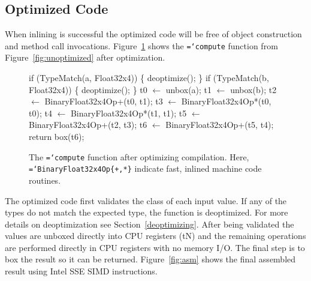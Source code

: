 \documentclass[preprint]{sigplanconf}
\newcommand{\ttt}[1]{{\texttt{\hyphenchar\font=`\-\relax #1}}}%
\begin{document}
\subsection{Optimized Code}

When inlining is successful the optimized code will be free of object
construction and method call invocations. Figure~\ref{fig:optimized} shows
the \ttt{compute} function from Figure~\ref{fig:unoptimized} after optimization.

\begin{figure}
\begin{small}
\begin{program}[style=tt, number=true]
if\tab{} (\!TypeMatch(a, Float32x4)) \{
  deoptimize();\untab{}
\}
if\tab{} (\!TypeMatch(b, Float32x4)) \{
  deoptimize();\untab{}
\}
t0 $\leftarrow$ unbox(a);
t1 $\leftarrow$ unbox(b);
t2 $\leftarrow$ BinaryFloat32x4Op+(t0, t1);
t3 $\leftarrow$ BinaryFloat32x4Op*(t0, t0);
t4 $\leftarrow$ BinaryFloat32x4Op*(t1, t1);
t5 $\leftarrow$ BinaryFloat32x4Op+(t2, t3);
t6 $\leftarrow$ BinaryFloat32x4Op+(t5, t4);
return box(t6);
\end{program}
\end{small}
\caption{The \ttt{compute} function after optimizing compilation. Here,
\ttt{BinaryFloat32x4Op\{+,*\}} indicate fast, inlined machine code routines.}
\label{fig:optimized}
\end{figure}

The optimized code first validates the class of each input value. If any of the
types do not match the expected type, the function is deoptimized. For more
details on deoptimization see Section~\ref{deoptimizing}. After being validated
the values are unboxed directly into CPU registers (tN) and the remaining
operations are performed directly in CPU registers with no memory I/O. The final
step is to box the result so it can be returned. Figure~\ref{fig:asm} shows the
final assembled result using Intel SSE SIMD instructions.
\end{document}
